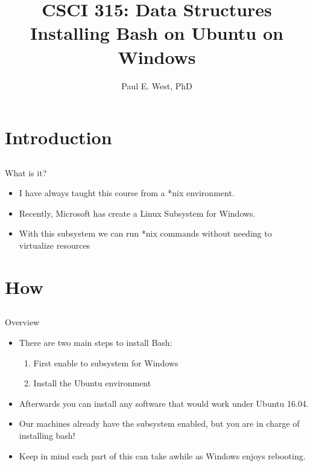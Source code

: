 \documentclass{beamer}
\title{CSCI 315: Data Structures \\ Installing Bash on Ubuntu on Windows}
\author{Paul E. West, PhD}
\institute{
  Department of Computer Science\\
  Charleston Southern University
}
\begin{document}
\begin{frame}
  \titlepage
\end{frame}

\section{Introduction}
\subsection{}

\begin{frame}{What is it?}
\begin{itemize}
\item I have always taught this course from a *nix environment.
\item Recently, Microsoft has create a Linux Subsystem for Windows.
\item With this subsystem we can run *nix commands without needing to virtualize resources
\end{itemize}
\end{frame}

\section{How}
\subsection{}

\begin{frame}{Overview}
\begin{itemize}
\item There are two main steps to install Bash:
\begin{enumerate}
\item First enable to subsystem for Windows
\item Install the Ubuntu environment
\end{enumerate}
\item Afterwards you can install any software that would work under Ubuntu 16.04.
\item Our machines already have the subsystem enabled, but you are in charge of installing bash!
\item Keep in mind each part of this can take awhile as Windows enjoys rebooting.
\end{itemize}
\end{frame}

\subsection{}
\end{document}
